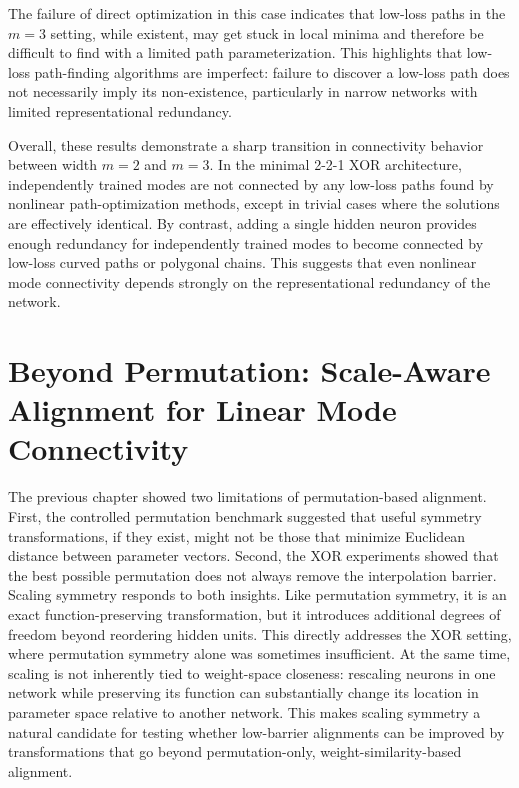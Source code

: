 \documentclass[11pt,a4paper]{report}
\begin{document}
The failure of direct optimization in this case indicates that low-loss paths in the $m=3$ setting, while existent, may get stuck in local minima and therefore be difficult to find with a limited path parameterization. This highlights that low-loss path-finding algorithms are imperfect: failure to discover a low-loss path does not necessarily imply its non-existence, particularly in narrow networks with limited representational redundancy.



Overall, these results demonstrate a sharp transition in connectivity behavior between width $m=2$ and $m=3$. In the minimal 2-2-1 XOR architecture, independently trained modes are not connected by any low-loss paths found by nonlinear path-optimization methods, except in trivial cases where the solutions are effectively identical. By contrast, adding a single hidden neuron provides enough redundancy for independently trained modes to become connected by low-loss curved paths or polygonal chains. This suggests that even nonlinear mode connectivity depends strongly on the representational redundancy of the network.

\chapter{Beyond Permutation: Scale-Aware Alignment for Linear Mode Connectivity}
\label{chap:scale_aware_alignment}
\label{chap:symmetry-aware}

The previous chapter showed two limitations of permutation-based alignment. First, the controlled permutation benchmark suggested that useful symmetry transformations, if they exist, might not be those that minimize Euclidean distance between parameter vectors. Second, the XOR experiments showed that the best possible permutation does not always remove the interpolation barrier. Scaling symmetry responds to both insights. Like permutation symmetry, it is an exact function-preserving transformation, but it introduces additional degrees of freedom beyond reordering hidden units. This directly addresses the XOR setting, where permutation symmetry alone was sometimes insufficient. At the same time, scaling is not inherently tied to weight-space closeness: rescaling neurons in one network while preserving its function can substantially change its location in parameter space relative to another network. This makes scaling symmetry a natural candidate for testing whether low-barrier alignments can be improved by transformations that go beyond permutation-only, weight-similarity-based alignment.
\end{document}
